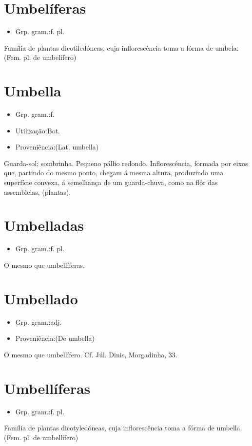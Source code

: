\documentclass{article}
\begin{document}
\section{Umbelíferas}
\begin{itemize}
\item {Grp. gram.:f. pl.}
\end{itemize}
Família de plantas dicotiledóneas, cuja inflorescência toma a fórma de umbela.
(Fem. pl. de \textunderscore umbelífero\textunderscore )
\section{Umbella}
\begin{itemize}
\item {Grp. gram.:f.}
\end{itemize}
\begin{itemize}
\item {Utilização:Bot.}
\end{itemize}
\begin{itemize}
\item {Proveniência:(Lat. \textunderscore umbella\textunderscore )}
\end{itemize}
Guarda-sol; sombrinha.
Pequeno pállio redondo.
Inflorescência, formada por eixos que, partindo do mesmo ponto, chegam á mesma altura, produzindo uma superfície convexa, á semelhança de um guarda-chuva, como na flôr das assembleias, (plantas).
\section{Umbelladas}
\begin{itemize}
\item {Grp. gram.:f. pl.}
\end{itemize}
O mesmo que \textunderscore umbellíferas\textunderscore .
\section{Umbellado}
\begin{itemize}
\item {Grp. gram.:adj.}
\end{itemize}
\begin{itemize}
\item {Proveniência:(De \textunderscore umbella\textunderscore )}
\end{itemize}
O mesmo que \textunderscore umbellífero\textunderscore . Cf. Júl. Dinis, \textunderscore Morgadinha\textunderscore , 33.
\section{Umbellíferas}
\begin{itemize}
\item {Grp. gram.:f. pl.}
\end{itemize}
Família de plantas dicotyledóneas, cuja inflorescência toma a fórma de umbella.
(Fem. pl. de \textunderscore umbellífero\textunderscore )
\end{document}
